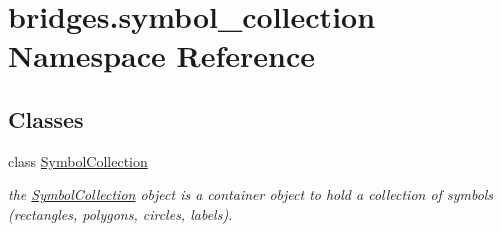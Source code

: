 \hypertarget{namespacebridges_1_1symbol__collection}{}\section{bridges.\+symbol\+\_\+collection Namespace Reference}
\label{namespacebridges_1_1symbol__collection}
\subsection*{Classes}
\begin{DoxyCompactItemize}
\item 
class \hyperlink{classbridges_1_1symbol__collection_1_1_symbol_collection}{Symbol\+Collection}
\begin{DoxyCompactList}\small\item\em the \hyperlink{classbridges_1_1symbol__collection_1_1_symbol_collection}{Symbol\+Collection} object is a container object to hold a collection of symbols (rectangles, polygons, circles, labels). \end{DoxyCompactList}\end{DoxyCompactItemize}
